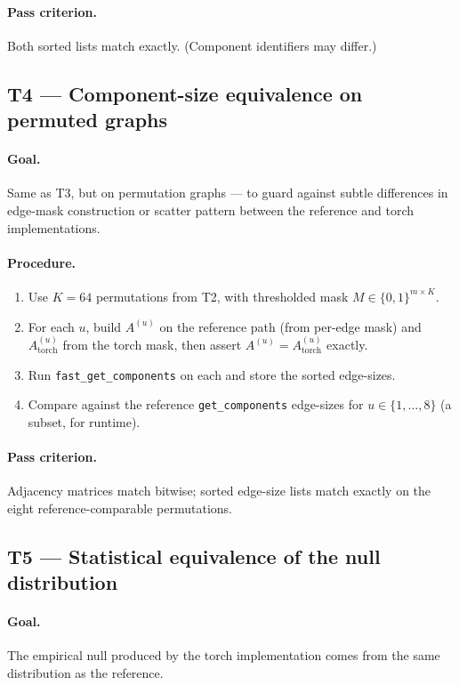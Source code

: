 \documentclass[11pt]{article}
\begin{document}
\paragraph{Pass criterion.} Both sorted lists match exactly. (Component identifiers may differ.)

\subsection{T4 --- Component-size equivalence on permuted graphs}

\paragraph{Goal.} Same as T3, but on permutation graphs --- to guard against subtle differences in edge-mask construction or scatter pattern between the reference and torch implementations.

\paragraph{Procedure.}
\begin{enumerate}[leftmargin=2.0em]
\item Use $K=64$ permutations from T2, with thresholded mask $M \in \{0,1\}^{m\times K}$.
\item For each $u$, build $A^{(u)}$ on the reference path (from per-edge mask) and $A^{(u)}_{\textrm{torch}}$ from the torch mask, then assert $A^{(u)} = A^{(u)}_{\textrm{torch}}$ exactly.
\item Run \texttt{fast\_get\_components} on each and store the sorted edge-sizes.
\item Compare against the reference \texttt{get\_components} edge-sizes for $u \in \{1, \ldots, 8\}$ (a subset, for runtime).
\end{enumerate}

\paragraph{Pass criterion.} Adjacency matrices match bitwise; sorted edge-size lists match exactly on the eight reference-comparable permutations.

\subsection{T5 --- Statistical equivalence of the null distribution}

\paragraph{Goal.} The empirical null produced by the torch implementation comes from the same distribution as the reference.
\end{document}
